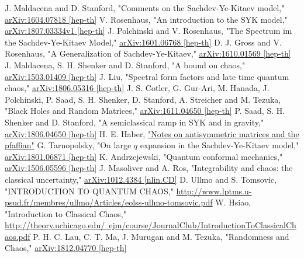 \begin{thebibliography}{99}
		J. Maldacena and D. Stanford,
		"Comments on the Sachdev-Ye-Kitaev model,"
		\href{https://arxiv.org/pdf/1604.07818.pdf}{arXiv:1604.07818 [hep-th]}
		V. Rosenhaus,
		"An introduction to the SYK model,"
		\href{https://arxiv.org/pdf/1807.03334.pdf}{arXiv:1807.03334v1 [hep-th]}
		J. Polchinski and V. Rosenhaus,
		"The Spectrum im the Sachdev-Ye-Kitaev Model,"
		\href{https://arxiv.org/pdf/1601.06768.pdf}{arXiv:1601.06768 [hep-th]}
		D. J. Gross and V. Rosenhaus,
		"A Generalization of Sachdev-Ye-Kitaev,"
		\href{https://arxiv.org/pdf/1610.01569.pdf}{arXiv:1610.01569 [hep-th]}
		J. Maldacena, S. H. Shenker and D. Stanford,
		"A bound on chaos,"
		\href{https://arxiv.org/pdf/1503.01409.pdf}{arXiv:1503.01409 [hep-th]}
		J. Liu,
		"Spectral form factors and late time quantum chaos,"
		\href{https://arxiv.org/pdf/1806.05316.pdf}{arXiv:1806.05316 [hep-th]}
		J. S. Cotler, G. Gur-Ari, M. Hanada, J. Polchinski, P. Saad, S. H. Shenker,
		D. Stanford, A. Streicher and M. Tezuka,
		"Black Holes and Random Matrices,"
		\href{https://arxiv.org/pdf/1611.04650.pdf}{arXiv:1611.04650 [hep-th]}
		P. Saad, S. H. Shenker and D. Stanford,
		"A semiclassical ramp in SYK and in gravity,"
		\href{https://arxiv.org/pdf/1806.06840.pdf}{arXiv:1806.04650 [hep-th]}
	H. E. Haber,
	\href{http://scipp.ucsc.edu/~haber/webpage/pfaffian2.pdf}{"Notes on antisymmetric matrices and the pfaffian"}
		G. Tarnopolsky,
		"On large $q$ expansion in the Sachdev-Ye-Kitaev model,"
		\href{https://arxiv.org/pdf/1801.06871.pdf}{arXiv:1801.06871 [hep-th]}
		K. Andrzejewski,
		"Quantum conformal mechanics,"
		\href{https://arxiv.org/pdf/1506.05596.pdf}{arXiv:1506.05596 [hep-th]}
	J. Masoliver and A. Ros,
	"Integrability and chaos: the classical uncertainty,"
	\href{https://arxiv.org/pdf/1012.4384.pdf}{arXiv:1012.4384 [nlin.CD]}
	D. Ullmo and S. Tomsovic,
	"INTRODUCTION TO QUANTUM CHAOS,"
	\href{http://www.lptms.u-psud.fr/membres/ullmo/Articles/eolss-ullmo-tomsovic.pdf}{http://www.lptms.u-psud.fr/membres/ullmo/Articles/eolss-ullmo-tomsovic.pdf}
	W. Hsiao,
	"Introduction to Classical Chaos,"
	\href{http://theory.uchicago.edu/~ejm/course/JournalClub/IntroductionToClassicalChaos.pdf}{http://theory.uchicago.edu/~ejm/course/JournalClub/IntroductionToClassicalChaos.pdf}
	P. H. C. Lau, C. T. Ma, J. Murugan and M. Tezuka,
	"Randomness and Chaos,"
	\href{https://arxiv.org/pdf/1812.04770.pdf}{arXiv:1812.04770 [hep-th]}
\end{thebibliography}
